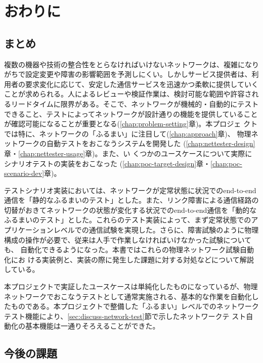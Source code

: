 
\chapter{おわりに}

 \section{まとめ}
 \label{sec:summary}

複数の機器や技術の整合性をとらなければいけないネットワークは、複雑になり
がちで設定変更や障害の影響範囲を予測しにくい。しかしサービス提供者は、利
用者の要求変化に応じて、安定した通信サービスを迅速かつ柔軟に提供していく
ことが求められる。人によるレビューや検証作業は、検討可能な範囲や許容され
るリードタイムに限界がある。そこで、ネットワークが機械的・自動的にテスト
できること、テストによってネットワークが設計通りの機能を提供していること
が確認可能になることが重要となる(\ref{chap:problem-setting}章)。本プロジェ
クトでは特に、ネットワークの「ふるまい」に注目して(\ref{chap:approach}章)、
物理ネットワークの自動テストをおこなうシステムを開発した
(\ref{chap:nettester-design}章・\ref{chap:nettester-usage}章)。また、い
くつかのユースケースについて実際にシナリオテストの実装をおこなった
(\ref{chap:poc-target-design}章・\ref{chap:poc-scenario-dev}章)。

テストシナリオ実装においては、ネットワークが定常状態に状況でのend-to-end
通信を「静的なふるまいのテスト」とした。また、リンク障害による通信経路の
切替がおきてネットワークの状態が変化する状況でのend-to-end通信を「動的な
ふるまいのテスト」とした。これらのテスト実装によって、まず定常状態でのア
プリケーションレベルでの通信試験を実現した。さらに、障害試験のように物理
構成の操作が必要で、従来は人手で作業しなければいけなかった試験についても、
自動化できるようになった。本書ではこれらの物理ネットワーク試験自動化にお
ける実装例と、実装の際に発生した課題に対する対処などについて解説している。

本プロジェクトで実証したユースケースは単純化したものになっているが、物理
ネットワークでおこなうテストとして通常実施される、基本的な作業を自動化し
たものである。本プロジェクトで整備した「ふるまい」レベルでのネットワーク
テスト機能により、\ref{sec:discuss-network-test}節で示したネットワークテ
スト自動化の基本機能は一通りそろえることができた。

 \section{今後の課題}
 \label{sec:future-work}


